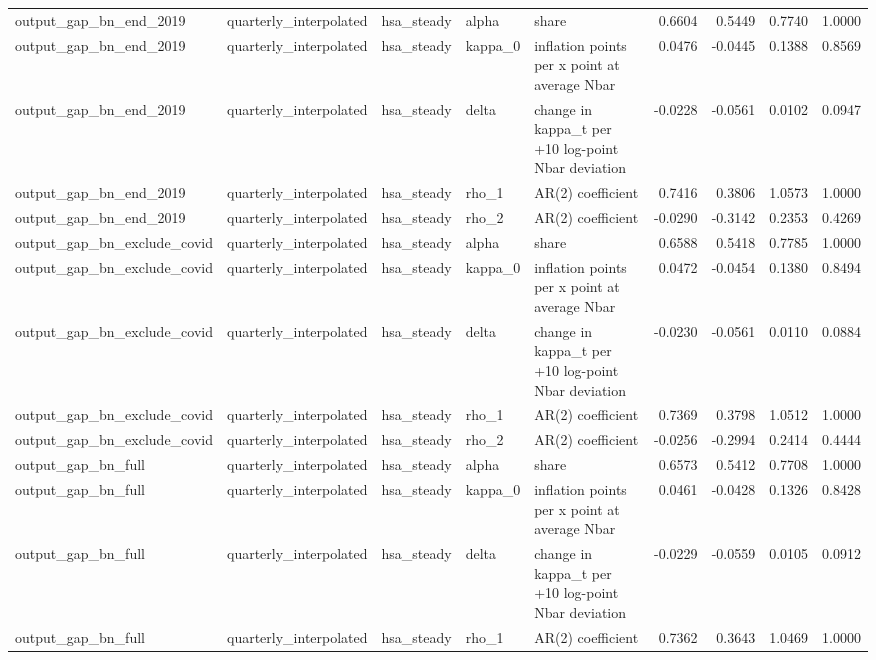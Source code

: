 \begin{tabular}{lllllrrrr}
output\_gap\_bn\_end\_2019 & quarterly\_interpolated & hsa\_steady & alpha & share & 0.6604 & 0.5449 & 0.7740 & 1.0000 \\
output\_gap\_bn\_end\_2019 & quarterly\_interpolated & hsa\_steady & kappa\_0 & inflation points per x point at average Nbar & 0.0476 & -0.0445 & 0.1388 & 0.8569 \\
output\_gap\_bn\_end\_2019 & quarterly\_interpolated & hsa\_steady & delta & change in kappa\_t per +10 log-point Nbar deviation & -0.0228 & -0.0561 & 0.0102 & 0.0947 \\
output\_gap\_bn\_end\_2019 & quarterly\_interpolated & hsa\_steady & rho\_1 & AR(2) coefficient & 0.7416 & 0.3806 & 1.0573 & 1.0000 \\
output\_gap\_bn\_end\_2019 & quarterly\_interpolated & hsa\_steady & rho\_2 & AR(2) coefficient & -0.0290 & -0.3142 & 0.2353 & 0.4269 \\
output\_gap\_bn\_exclude\_covid & quarterly\_interpolated & hsa\_steady & alpha & share & 0.6588 & 0.5418 & 0.7785 & 1.0000 \\
output\_gap\_bn\_exclude\_covid & quarterly\_interpolated & hsa\_steady & kappa\_0 & inflation points per x point at average Nbar & 0.0472 & -0.0454 & 0.1380 & 0.8494 \\
output\_gap\_bn\_exclude\_covid & quarterly\_interpolated & hsa\_steady & delta & change in kappa\_t per +10 log-point Nbar deviation & -0.0230 & -0.0561 & 0.0110 & 0.0884 \\
output\_gap\_bn\_exclude\_covid & quarterly\_interpolated & hsa\_steady & rho\_1 & AR(2) coefficient & 0.7369 & 0.3798 & 1.0512 & 1.0000 \\
output\_gap\_bn\_exclude\_covid & quarterly\_interpolated & hsa\_steady & rho\_2 & AR(2) coefficient & -0.0256 & -0.2994 & 0.2414 & 0.4444 \\
output\_gap\_bn\_full & quarterly\_interpolated & hsa\_steady & alpha & share & 0.6573 & 0.5412 & 0.7708 & 1.0000 \\
output\_gap\_bn\_full & quarterly\_interpolated & hsa\_steady & kappa\_0 & inflation points per x point at average Nbar & 0.0461 & -0.0428 & 0.1326 & 0.8428 \\
output\_gap\_bn\_full & quarterly\_interpolated & hsa\_steady & delta & change in kappa\_t per +10 log-point Nbar deviation & -0.0229 & -0.0559 & 0.0105 & 0.0912 \\
output\_gap\_bn\_full & quarterly\_interpolated & hsa\_steady & rho\_1 & AR(2) coefficient & 0.7362 & 0.3643 & 1.0469 & 1.0000 \\

\end{tabular}

